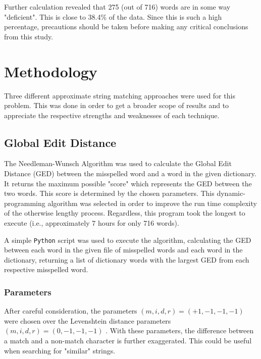 \documentclass[11pt]{article}
\begin{document}
Further calculation revealed that 275 (out of 716) words are in some way "deficient". This is close to 38.4\% of the data. Since this is such a high percentage, precautions should be taken before making any critical conclusions from this study. %




\section{Methodology}
Three different approximate string matching approaches were used for this problem. This was done in order to get a broader scope of results and to appreciate the respective strengths and weaknesses of each technique.



\subsection{Global Edit Distance}
The Needleman-Wunsch Algorithm %
was used to calculate the Global Edit Distance (GED) between the misspelled word and a word in the given dictionary. It returns the maximum possible "score" which represents the GED between the two words. This score is determined by the chosen parameters. This dynamic-programming algorithm was selected in order to improve the run time complexity of the otherwise lengthy process. Regardless, this program took the longest to execute (i.e., approximately 7 hours for only 716 words).

A simple \texttt{Python} script was used to execute the algorithm, calculating the GED between each word in the given file of misspelled words and each word in the dictionary, returning a list of dictionary words with the largest GED from each respective misspelled word.

\subsubsection{Parameters}
After careful consideration, the parameters \((m, i, d, r) = (+1, -1, -1, -1)\) were chosen over the Levenshtein distance parameters \((m, i, d, r) = (0, -1, -1, -1)\) %
. With these parameters, the difference between a match and a non-match character is further exaggerated. This could be useful when searching for "similar" strings.
\end{document}
